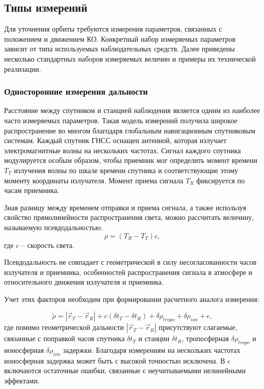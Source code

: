 \subsection{Типы измерений}

Для уточнения орбиты требуются измерения параметров, связанных с положением и движением КО.
Конкретный набор измеряемых параметров зависит от типа используемых наблюдательных средств.
Далее приведены несколько стандартных наборов измеряемых величин и примеры их технической реализации.

\subsubsection{Односторонние измерения дальности}
Расстояние между спутником и станцией наблюдения является одним из наиболее часто измеряемых параметров.
Такая модель измерений получила широкое распространение во многом благодаря глобальным навигационным спутниковым системам.
Каждый спутник ГНСС оснащен антенной, которая излучает электромагнитные волны на нескольких частотах.
Сигнал каждого спутника модулируется особым образом, чтобы приемник мог определить момент времени $T_{T}$ излучения волны по шкале времени спутника
и соответствующие этому моменту координаты излучателя. Момент приема сигнала $T_{R}$ фиксируется по часам приемника.

Зная разницу между временем отправки и приема сигнала, а также используя свойство прямолинейности распространения света, можно 
рассчитать величину, называемую псевдодальностью:
\begin{equation*}
    \rho = (T_{R} - T_{T}) c,
\end{equation*}
где $c$ -- скорость света.

Псевдодальность не совпадает с геометрической в силу несогласованности часов излучателя и приемника, 
особенностей распространения сигнала в атмосфере и относительного движения излучателя и приемника.

Учет этих факторов необходим при формировании расчетного аналога измерения:

\begin{equation*}
    \tilde{\rho} = |\vec{r}_{T} - \vec{r}_{R}| 
                    + c \left( \delta t_{T} - \delta t_{R} \right)
                    + \delta \rho_{tropo} + \delta \rho_{ion} + \epsilon,
\end{equation*}
где помимо геометрической дальности $|\vec{r}_{T} - \vec{r}_{R}|$ присутствуют слагаемые,
связанные с поправкой часов спутника $\delta t_{T}$ и станции $\delta t_{R}$, тропосферная $\delta \rho_{tropo}$ и ионосферная $\delta \rho_{ion}$ задержки.
Благодаря измерениям на нескольких частотах ионосферная задержка может быть с высокой точностью исключена.
В $\epsilon$ включаются остаточные ошибки, связанные с неучитываемыми нелинейными эффектами.

